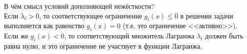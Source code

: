 \begin{remark}
В чём смысл условий дополняющей нежёсткости?\\
Если $\lambda_i > 0$, то соответствующее ограничение $g_i(x) \leqslant 0$ в решении задачи выполняется как равенство $g_i(x) = 0$ (т.е. это ограничение <<активно>>).\\
Если же $g_i(x) < 0$, то соответствующий множитель Лагранжа $\lambda_i$ должен быть равна нулю, и это ограничение не участвует в функции Лагранжа.
\end{remark}